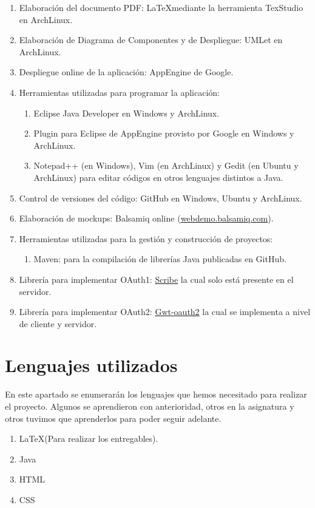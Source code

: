 \documentclass{scrartcl}
\begin{document}
\begin{enumerate}[\textbf{\textperiodcentered}]
	\item Elaboración del documento PDF: \LaTeX  mediante la herramienta TexStudio en ArchLinux.
	\item Elaboración de Diagrama de Componentes y de Despliegue: UMLet en ArchLinux.
	\item Despliegue online de la aplicación: AppEngine de Google.
	\item Herramientas utilizadas para programar la aplicación:
	\begin{enumerate}[\textbf{\textperiodcentered}]
		\item Eclipse Java Developer en Windows y ArchLinux.
		\item Plugin para Eclipse de AppEngine provisto por Google en Windows y ArchLinux.
		\item Notepad++ (en Windows), Vim (en ArchLinux) y Gedit (en Ubuntu y ArchLinux) para editar códigos en otros lenguajes distintos a Java.
	\end{enumerate}
	\item Control de versiones del código: GitHub en Windows, Ubuntu y ArchLinux.
	\item Elaboración de mockups: Balsamiq online (\href{http://webdemo.balsamiq.com}{webdemo.balsamiq.com}).
	\item Herramientas utilizadas para la gestión y construcción de proyectos:
	\begin{enumerate}[\textbf{\textperiodcentered}]
		\item Maven: para la compilación de librerías Java publicadas en GitHub.
	\end{enumerate}	
	\item Librería para implementar OAuth1: \href{https://github.com/fernandezpablo85/scribe-java}{Scribe} la cual solo está presente en el servidor.
	\item Librería para implementar OAuth2: \href{https://code.google.com/p/gwt-oauth2/}{Gwt-oauth2} la cual se implementa a nivel de cliente y servidor.

	
\end{enumerate}

\section{Lenguajes  utilizados}
En este apartado se enumerarán  los lenguajes que hemos necesitado para realizar el proyecto. Algunos se aprendieron con anterioridad, otros en la asignatura y otros tuvimos que aprenderlos para poder seguir adelante. 
\begin{enumerate}[\textbf{\textperiodcentered}]
	\item \LaTeX (Para realizar los entregables).
	\item Java
	\item HTML
	\item CSS
	
\end{enumerate}




	
\end{document}
